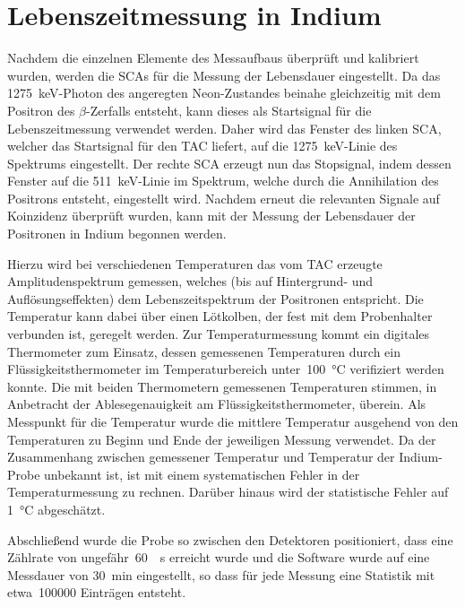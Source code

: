 \documentclass[11pt, a4paper]{article}
\numberwithin{equation}{section}
\begin{document}
\clearpage
\section{Lebenszeitmessung in Indium}
Nachdem die einzelnen Elemente des Messaufbaus überprüft und kalibriert wurden, werden die SCAs für die Messung der Lebensdauer eingestellt.
Da das \SI{1275}{\keV}-Photon des angeregten Neon-Zustandes beinahe gleichzeitig mit dem Positron des $\beta$-Zerfalls entsteht, kann dieses als Startsignal für die Lebenszeitmessung verwendet werden.
Daher wird das Fenster des linken SCA, welcher das Startsignal für den TAC liefert, auf die \SI{1275}{\keV}-Linie des Spektrums eingestellt.
Der rechte SCA erzeugt nun das Stopsignal, indem dessen Fenster auf die \SI{511}{\keV}-Linie im Spektrum, welche durch die Annihilation des Positrons entsteht, eingestellt wird.
Nachdem erneut die relevanten Signale auf Koinzidenz überprüft wurden, kann mit der Messung der Lebensdauer der Positronen in Indium begonnen werden.

Hierzu wird bei verschiedenen Temperaturen das vom TAC erzeugte Amplitudenspektrum gemessen, welches (bis auf Hintergrund- und Auflösungseffekten) dem Lebenszeitspektrum der Positronen entspricht.
Die Temperatur kann dabei über einen Lötkolben, der fest mit dem Probenhalter verbunden ist, geregelt werden.
Zur Temperaturmessung kommt ein digitales Thermometer zum Einsatz, dessen gemessenen Temperaturen durch ein Flüssigkeitsthermometer im Temperaturbereich unter~\SI{100}{\degreeCelsius} verifiziert werden konnte.
Die mit beiden Thermometern gemessenen Temperaturen stimmen, in Anbetracht der Ablesegenauigkeit am Flüssigkeitsthermometer, überein.
Als Messpunkt für die Temperatur wurde die mittlere Temperatur ausgehend von den Temperaturen zu Beginn und Ende der jeweiligen Messung verwendet.
Da der Zusammenhang zwischen gemessener Temperatur und Temperatur der Indium-Probe unbekannt ist, ist mit einem systematischen Fehler in der Temperaturmessung zu rechnen.
Darüber hinaus wird der statistische Fehler auf \SI{1}{\degreeCelsius} abgeschätzt.

Abschließend wurde die Probe so zwischen den Detektoren positioniert, dass eine Zählrate von ungefähr~\SI{60}{\per\second} erreicht wurde und die Software wurde auf eine Messdauer von \SI{30}{min} eingestellt, so dass für jede Messung eine Statistik mit etwa~\num{100000} Einträgen entsteht.
\end{document}
